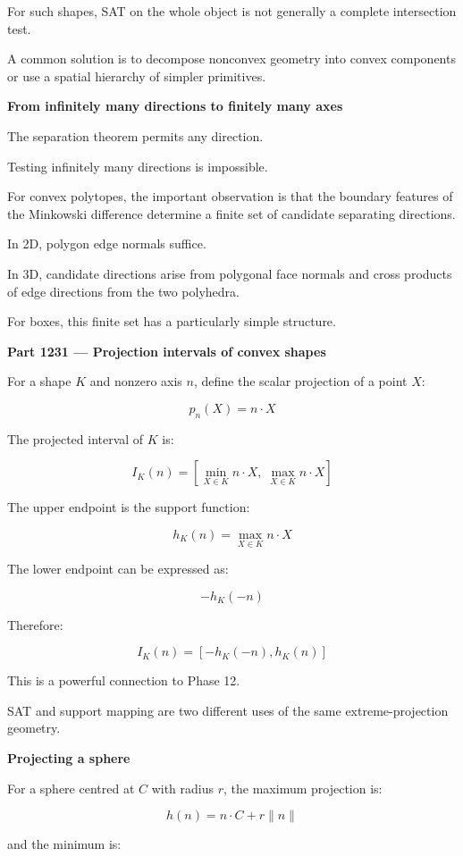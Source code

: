 For such shapes, SAT on the whole object is not generally a complete intersection test.

A common solution is to decompose nonconvex geometry into convex components or use a spatial hierarchy of simpler primitives.

\textbf{From infinitely many directions to finitely many axes}

The separation theorem permits any direction.

Testing infinitely many directions is impossible.

For convex polytopes, the important observation is that the boundary features of the Minkowski difference determine a finite set of candidate separating directions.

In 2D, polygon edge normals suffice.

In 3D, candidate directions arise from polygonal face normals and cross products of edge directions from the two polyhedra.

For boxes, this finite set has a particularly simple structure.

\textbf{Part 1231 --- Projection intervals of convex shapes}

For a shape \(K\) and nonzero axis \(n\), define the scalar projection of a point \(X\):

\[
p_n(X)=n\cdot X
\]

The projected interval of \(K\) is:

\[
\boxed{ I_K(n)= \left[ \min_{X\in K}n\cdot X,\; \max_{X\in K}n\cdot X \right] }
\]

The upper endpoint is the support function:

\[
\boxed{ h_K(n)=\max_{X\in K}n\cdot X }
\]

The lower endpoint can be expressed as:

\[
\boxed{ -h_K(-n) }
\]

Therefore:

\[
\boxed{ I_K(n)=[-h_K(-n),h_K(n)] }
\]

This is a powerful connection to Phase 12.

SAT and support mapping are two different uses of the same extreme-projection geometry.

\textbf{Projecting a sphere}

For a sphere centred at \(C\) with radius \(r\), the maximum projection is:

\[
h(n)=n\cdot C+r\|n\|
\]

and the minimum is:

